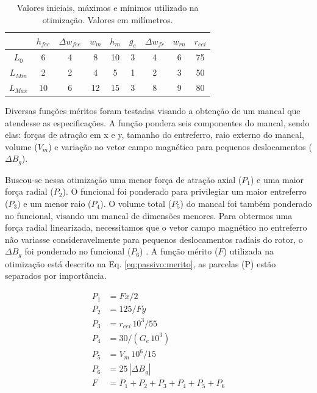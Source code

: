 \begin{table}[ht!]
	\centering
	\begin{tabular}{c c c c c c c c c}
		& $h_{fee}$ &$\Delta w_{fee}$ & $w_m$ & $h_m$  & $g_e$ & $\Delta w_{fr}$ & $w_{rn}$ & $r_{eei}$ \\ \hline \hline
		
		$L_{0}$ 	&  6 &   4 &    8 &    10 &   3 &  4 &   6 &    75 \\
		$L_{Min}$ &  2    &  2   &  4  &   5&    1  & 2  &  3&    50\\			
		$L_{Max}$ &  10 &  6 &  12  &   15  &  3  &  8  &   9   &   80		
	\end{tabular} 
	\caption{Valores iniciais, máximos e mínimos utilizado na otimização. Valores em milímetros.}
	\label{tab:passivo:restrições} 
\end{table}

Diversas funções méritos foram testadas visando a obtenção de um mancal que atendesse as especificações. A função pondera seis componentes do mancal, sendo elas: forças de atração em x e y, tamanho do entreferro, raio externo do mancal,  volume ($V_m$) e variação no vetor campo magnético para pequenos deslocamentos ($\Delta B_{g}$).

Buscou-se nessa otimização uma menor força de atração axial ($P_1$) e uma maior força radial ($P_2$). O funcional foi ponderado para privilegiar um maior entreferro ($P_3$) e um menor raio ($P_4$). O volume total ($P_5$) do mancal foi também ponderado no funcional, visando um mancal de dimensões menores. Para obtermos uma força radial linearizada, necessitamos que o vetor campo magnético no entreferro não variasse consideravelmente para pequenos deslocamentos radiais do rotor, o $\Delta B_{g}$ foi ponderado no funcional ($P_6$) . A função mérito ($F$) utilizada na otimização está descrito na Eq. \ref{eq:passivo:merito}, as parcelas (P) estão separados por importância.

\begin{align}
P_1 &= Fx/2 				\\ 
P_2 &= 125/Fy		\\        
P_3 &= r_{eei}\, 10^3/55 \\     
P_4&= 30/(G_e \,  10^3) \\    
P_5 &= V_m\, 10^6/15 \\        
P_6 &= 25 \,  |{\Delta B_{g}}|\\   
F &= P_1 + P_2 + P_3 + P_4 + P_5 + P_6   \label{eq:passivo:merito}
\end{align}

